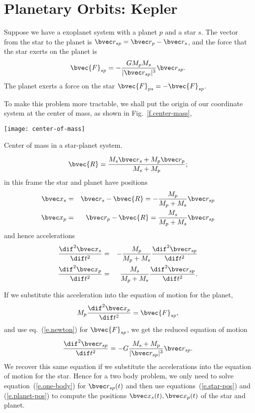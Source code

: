 \section{Planetary Orbits: Kepler}

Suppose we have a exoplanet system with a planet $p$ and a star $s$.  The vector from the star to the planet is $\rv_{sp} = \rv_{p}-\rv_{s}$, and the force that the star exerts on the planet is
\begin{equation}\label{e.newton}
	\bvec{F}_{sp} = -\frac{GM_{p}M_{s}}{|\rv_{sp}|^{3}} \rv_{sp}.
\end{equation}
The planet exerts a force on the star $\bvec{F}_{ps} = -\bvec{F}_{sp}$.

To make this problem more tractable, we shall put the origin of our coordinate system at the center of mass, as shown in Fig.~\ref{f.center-mass},
\begin{marginfigure}
\texttt{[image: center-of-mass]}
\caption[Center of mass]{Center of mass in a star-planet system.}
\label{f.center-mass}
\end{marginfigure}
\[ \bvec{R} = \frac{M_{s}\rv_{s} + M_{p}\rv_{p}}{M_{s}+M_{p}}; \]
in this frame the star and planet have positions 
\begin{eqnarray}
 \xv_{s} &=& \rv_{s}-\bvec{R} = -\frac{M_{p}}{M_{p}+M_{s}}\rv_{sp}\label{e.star-pos}\\
 \xv_{p} &=& \rv_{p}-\bvec{R} = \frac{M_{s}}{M_{p}+M_{s}}\rv_{sp}\label{e.planet-pos}
\end{eqnarray}
and hence accelerations
\begin{eqnarray*}
 \DDtt{\xv_{s}} &=& -\frac{M_{p}}{M_{p}+M_{s}}\DDtt{\rv_{sp}} \\
 \DDtt{\xv_{p}} &=& \frac{M_{s}}{M_{p}+M_{s}}\DDtt{\rv_{sp}}.
\end{eqnarray*}

If we substitute this acceleration into the equation of motion for the planet,
\[ M_{p}\DDtt{\xv_{p}} = \bvec{F}_{sp}, \]
and use eq.~(\ref{e.newton}) for $\bvec{F}_{sp}$, we get the reduced equation of motion
\begin{equation}\label{e.one-body}
 \DDtt{\rv_{sp}} = -G\frac{M_{s}+M_{p}}{|\rv_{sp}|^{3}} \rv_{sp}.
\end{equation}
We recover this same equation if we substitute the accelerations into the equation of motion for the star. Hence for a two body problem, we only need to solve equation~(\ref{e.one-body}) for $\rv_{sp}(t)$ and then use equations~(\ref{e.star-pos}) and (\ref{e.planet-pos}) to compute the positions $\xv_{s}(t),\xv_{p}(t)$ of the star and planet.

